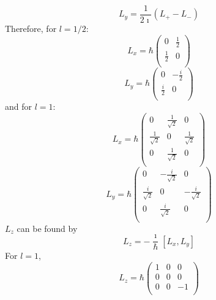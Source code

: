 \documentclass{article}
\begin{document}
$$L_{y} = \frac{1}{2 \imath} \left(L_{+} - L_{-}\right)$$
Therefore, for $l=1/2$:
$$L_{x} = \hbar \left(
    \begin{array}{cc}
     0 & \frac{1}{2} \\
     \frac{1}{2} & 0 \\
    \end{array}
    \right) $$
$$L_{y} = \hbar \left(
    \begin{array}{cc}
     0 & -\frac{i}{2} \\
     \frac{i}{2} & 0 \\
    \end{array}
    \right) $$
and for $l=1$:
$$L_{x} = \hbar \left(
    \begin{array}{ccc}
     0 & \frac{1}{\sqrt{2}} & 0 \\
     \frac{1}{\sqrt{2}} & 0 & \frac{1}{\sqrt{2}} \\
     0 & \frac{1}{\sqrt{2}} & 0 \\
    \end{array}
    \right)$$
$$L_{y}=\hbar \left(
    \begin{array}{ccc}
     0 & -\frac{i}{\sqrt{2}} & 0 \\
     \frac{i}{\sqrt{2}} & 0 & -\frac{i}{\sqrt{2}} \\
     0 & \frac{i}{\sqrt{2}} & 0 \\
    \end{array}
    \right)$$
$L_{z}$ can be found by $$L_{z} = -\frac{\imath}{\hbar} \left[L_{x},L_{y} \right]$$
For $l=1$, 
$$L_{z} = \hbar \left(
    \begin{array}{ccc}
     1 & 0 & 0 \\
     0 & 0 & 0 \\
     0 & 0 & -1 \\
    \end{array}
    \right)$$
\end{document}
